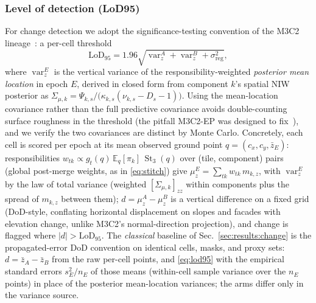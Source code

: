 \subsubsection{Level of detection (LoD95)}
For change detection we adopt the significance-testing convention of the
M3C2 lineage~\cite{lague2013m3c2,winiwarter2021m3c2ep}: a per-cell threshold
\begin{equation}
\mathrm{LoD}_{95}
 = 1.96\sqrt{\operatorname{var}^{A}_{z} + \operatorname{var}^{B}_{z}
   + \sigma_{\mathrm{reg}}^{2}},
\label{eq:lod95}
\end{equation}
where $\operatorname{var}^{E}_{z}$ is the vertical variance of the
responsibility-weighted \emph{posterior mean location} in epoch $E$, derived
in closed form from component $k$'s spatial NIW posterior as
$\Sigma_{\mu,k}=\Psi_{k,s}/\bigl(\kappa_{k,s}(\nu_{k,s}-D_s-1)\bigr)$. Using the
mean-location covariance rather than the full predictive covariance
avoids double-counting surface roughness in the threshold (the
pitfall M3C2-EP was designed to fix~\cite{winiwarter2021m3c2ep}), and
we verify the two covariances are distinct by Monte Carlo. Concretely,
each cell is scored per epoch at its mean observed ground point
$q = (c_x, c_y, \bar z_E)$: responsibilities
$w_{tk} \propto g_t(q)\, \mathbb{E}_q[\pi_k]\,
\operatorname{St}_3(q)$ over (tile, component) pairs (global
post-merge weights, as in \eqref{eq:stitch}) give
$\mu^E_z = \sum_{tk} w_{tk}\, m_{k,z}$, with
$\operatorname{var}^E_z$ by the law of total variance (weighted
$[\Sigma_{\mu,k}]_{zz}$ within components plus the spread of $m_{k,z}$
between them); $d = \mu^A_z - \mu^B_z$ is a vertical difference on a
fixed grid (DoD-style, conflating horizontal displacement on slopes
and facades with elevation change, unlike M3C2's normal-direction
projection), and change is flagged where $|d| > \mathrm{LoD}_{95}$.
The \emph{classical} baseline of Sec.~\ref{sec:results:change} is the
propagated-error DoD convention on identical cells, masks, and proxy
sets: $d = \bar z_A - \bar z_B$ from the raw per-cell points, and
\eqref{eq:lod95} with the empirical standard errors $s^2_E/n_E$ of
those means (within-cell sample variance over the $n_E$ points) in
place of the posterior mean-location variances; the arms differ
only in the variance source.
